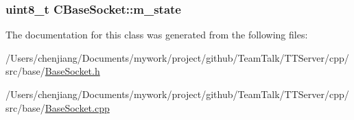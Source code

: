 \subsubsection[{m\+\_\+state}]{\setlength{\rightskip}{0pt plus 5cm}uint8\+\_\+t C\+Base\+Socket\+::m\+\_\+state\hspace{0.3cm}{\ttfamily [private]}}\label{class_c_base_socket_a1dfbcf388204b43e5a9739487c29692c}


The documentation for this class was generated from the following files\+:\begin{DoxyCompactItemize}
\item 
/\+Users/chenjiang/\+Documents/mywork/project/github/\+Team\+Talk/\+T\+T\+Server/cpp/src/base/\hyperlink{base_2_base_socket_8h}{Base\+Socket.\+h}\item 
/\+Users/chenjiang/\+Documents/mywork/project/github/\+Team\+Talk/\+T\+T\+Server/cpp/src/base/\hyperlink{base_2_base_socket_8cpp}{Base\+Socket.\+cpp}\end{DoxyCompactItemize}
